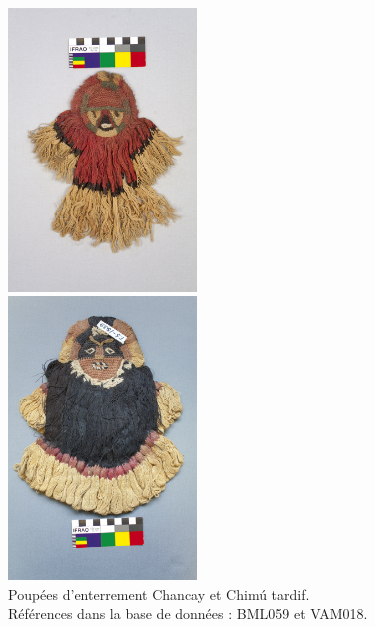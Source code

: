 \begin{figure}[!h]
    \begin{minipage}[c]{.5\linewidth}
            \begin{center}
                \includegraphics[width=5cm]{../images/BML059.jpg}
            \end{center}
    \end{minipage}
        \begin{minipage}[c]{.5\linewidth}
        \begin{center}
        		\includegraphics[width=5cm]{../images/VAM018.jpg}
	\end{center}
    \end{minipage}
   \caption{Poupées d'enterrement Chancay et Chimú tardif. \\ Références dans la base de données : BML059 et VAM018.}
   \label{fig:poupees}
\end{figure}


